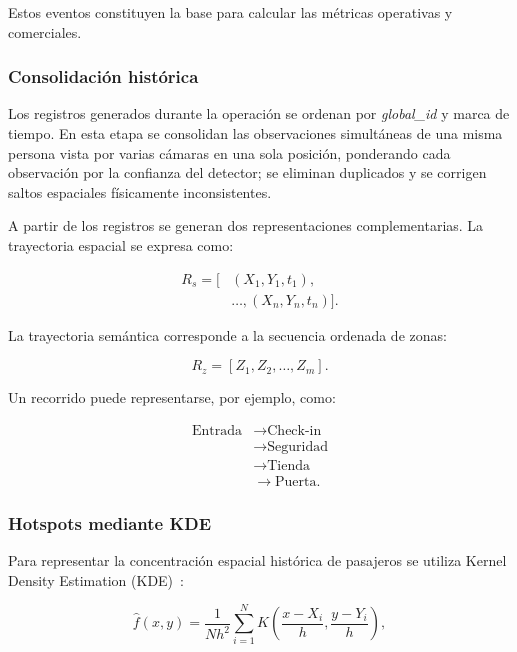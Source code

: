 \documentclass[12pt,a4paper]{article}
\begin{document}
Estos eventos constituyen la base para calcular las métricas operativas
y comerciales.

\subsubsection{Consolidación histórica}

Los registros generados durante la operación se ordenan por
\textit{global\_id} y marca de tiempo. En esta etapa se consolidan las
observaciones simultáneas de una misma persona vista por varias cámaras
en una sola posición, ponderando cada observación por la confianza del
detector; se eliminan duplicados y se corrigen saltos
espaciales físicamente inconsistentes.

A partir de los registros se generan dos representaciones
complementarias. La trayectoria espacial se expresa como:

\begin{equation}
\begin{aligned}
R_s=[
&(X_1,Y_1,t_1),\\
&\ldots,(X_n,Y_n,t_n)].
\end{aligned}
\end{equation}

La trayectoria semántica corresponde a la secuencia ordenada de zonas:

\begin{equation}
R_z=[Z_1,Z_2,\ldots,Z_m].
\end{equation}

Un recorrido puede representarse, por ejemplo, como:

\begin{equation}
\begin{aligned}
\text{Entrada}
&\rightarrow \text{Check-in}\\
&\rightarrow \text{Seguridad}\\
&\rightarrow \text{Tienda}\\
&\rightarrow \text{Puerta}.
\end{aligned}
\end{equation}

\subsubsection{Hotspots mediante KDE}

Para representar la concentración espacial histórica de pasajeros se
utiliza Kernel Density Estimation (KDE)~\cite{parzen1962}:

\begin{equation}
\hat{f}(x,y)
=
\frac{1}{Nh^2}
\sum_{i=1}^{N}
K
\left(
\frac{x-X_i}{h},
\frac{y-Y_i}{h}
\right),
\end{equation}
\end{document}
